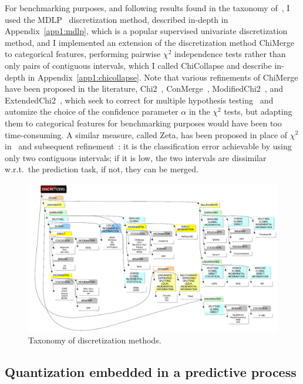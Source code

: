 For benchmarking purposes, and following results found in the taxonomy of~\cite{ramirez2016data}, I used the MDLP~\cite{fayyad1993multi} discretization method, described in-depth in Appendix~\ref{app1:mdlp}, which is a popular supervised univariate discretization method, and I implemented an extension of the discretization method ChiMerge~\cite{kerber1992chimerge} to categorical features, performing pairwise $\chi^2$ independence tests rather than only pairs of contiguous intervals, which I called ChiCollapse and describe in-depth in Appendix~\ref{app1:chicollapse}. Note that various refinements of ChiMerge have been proposed in the literature, Chi2~\cite{liu1995chi2}, ConMerge~\cite{wang1998concurrent}, ModifiedChi2~\cite{tay2002modified}, and ExtendedChi2~\cite{su2005extended}, which seek to correct for multiple hypothesis testing~\cite{shaffer1995multiple} and automize the choice of the confidence parameter $\alpha$ in the $\chi^2$ tests, but adapting them to categorical features for benchmarking purposes would have been too time-consuming. A similar measure, called Zeta, has been proposed in place of $\chi^2$ in~\cite{ho1997zeta} and subsequent refinement~\cite{ho1998efficient}: it is the classification error achievable by using only two contiguous intervals; if it is low, the two intervals are dissimilar w.r.t.\ the prediction task, if not, they can be merged.

\begin{figure}[!ht]
\includegraphics[width=\textwidth]{figures/chapitre4/taxonomy.PNG}
\caption{Taxonomy of discretization methods.}
\label{fig:taxonomy}
\end{figure}



\subsection{Quantization embedded in a predictive process}

